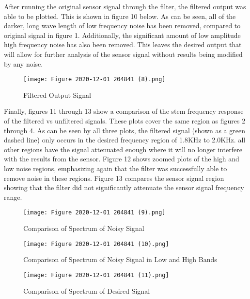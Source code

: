\documentclass[12pt, titlepage]{article}
\begin{document}
    \clearpage
    After running the original sensor signal through the filter, the filtered output was able to be plotted.  This is shown in figure 10 below.  As can be seen, all of the darker, long wave length of low frequency noise has been removed, compared to original signal in figure 1.  Additionally, the significant amount of low amplitude high frequency noise has also been removed.  This leaves the desired output that will allow for further analysis of the sensor signal without results being modified by any noise.
        \begin{figure}[h!]
            \centering
            \texttt{[image: Figure 2020-12-01 204841 (8).png]}
            \caption{Filtered Output Signal}
            \label{fig:my_label}
        \end{figure}
    \clearpage
    Finally, figures 11 through 13 show a comparison of the stem frequency response of the filtered vs unfiltered signals.  These plots cover the same region as figures 2 through 4.  As can be seen by all three plots, the filtered signal (shown as a green dashed line) only occurs in the desired frequency region of 1.8KHz to 2.0KHz.  all other regions have the signal attenuated enough where it will no longer interfere with the results from the sensor.  Figure 12 shows zoomed plots of the high and low noise regions, emphasizing again that the filter was successfully able to remove noise in these regions.  Figure 13 compares the sensor signal region showing that the filter did not significantly attenuate the sensor signal frequency range.
        \begin{figure}[h!]
            \centering
            \texttt{[image: Figure 2020-12-01 204841 (9).png]}
            \caption{Comparison of Spectrum of Noisy Signal}
            \label{fig:my_label}
        \end{figure}
        
        \begin{figure}[h!]
            \centering
            \texttt{[image: Figure 2020-12-01 204841 (10).png]}
            \caption{Comparison of Spectrum of Noisy Signal in Low and High Bands}
            \label{fig:my_label}
        \end{figure}
        
        \begin{figure}[h!]
            \centering
            \texttt{[image: Figure 2020-12-01 204841 (11).png]}
            \caption{Comparison of Spectrum of Desired Signal}
            \label{fig:my_label}
        \end{figure}
        
\end{document}
